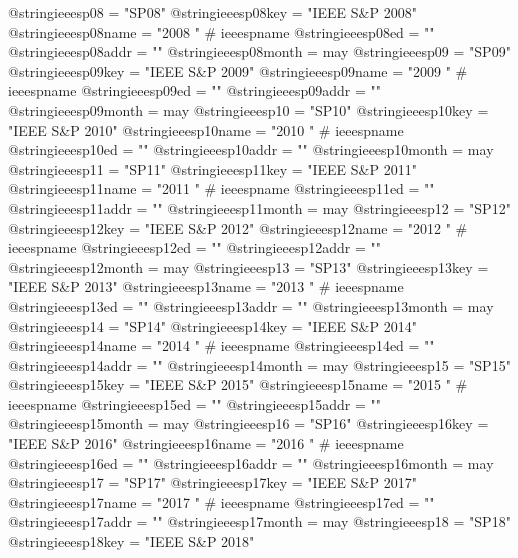 @string{ieeesp08 =              "SP08"}
@string{ieeesp08key =           "IEEE S\&P 2008"}
@string{ieeesp08name =          "2008 " # ieeespname}
@string{ieeesp08ed =            ""}
@string{ieeesp08addr =          ""}
@string{ieeesp08month =         may}
@string{ieeesp09 =              "SP09"}
@string{ieeesp09key =           "IEEE S\&P 2009"}
@string{ieeesp09name =          "2009 " # ieeespname}
@string{ieeesp09ed =            ""}
@string{ieeesp09addr =          ""}
@string{ieeesp09month =         may}
@string{ieeesp10 =              "SP10"}
@string{ieeesp10key =           "IEEE S\&P 2010"}
@string{ieeesp10name =          "2010 " # ieeespname}
@string{ieeesp10ed =            ""}
@string{ieeesp10addr =          ""}
@string{ieeesp10month =         may}
@string{ieeesp11 =              "SP11"}
@string{ieeesp11key =           "IEEE S\&P 2011"}
@string{ieeesp11name =          "2011 " # ieeespname}
@string{ieeesp11ed =            ""}
@string{ieeesp11addr =          ""}
@string{ieeesp11month =         may}
@string{ieeesp12 =              "SP12"}
@string{ieeesp12key =           "IEEE S\&P 2012"}
@string{ieeesp12name =          "2012 " # ieeespname}
@string{ieeesp12ed =            ""}
@string{ieeesp12addr =          ""}
@string{ieeesp12month =         may}
@string{ieeesp13 =              "SP13"}
@string{ieeesp13key =           "IEEE S\&P 2013"}
@string{ieeesp13name =          "2013 " # ieeespname}
@string{ieeesp13ed =            ""}
@string{ieeesp13addr =          ""}
@string{ieeesp13month =         may}
@string{ieeesp14 =              "SP14"}
@string{ieeesp14key =           "IEEE S\&P 2014"}
@string{ieeesp14name =          "2014 " # ieeespname}
@string{ieeesp14ed =            ""}
@string{ieeesp14addr =          ""}
@string{ieeesp14month =         may}
@string{ieeesp15 =              "SP15"}
@string{ieeesp15key =           "IEEE S\&P 2015"}
@string{ieeesp15name =          "2015 " # ieeespname}
@string{ieeesp15ed =            ""}
@string{ieeesp15addr =          ""}
@string{ieeesp15month =         may}
@string{ieeesp16 =              "SP16"}
@string{ieeesp16key =           "IEEE S\&P 2016"}
@string{ieeesp16name =          "2016 " # ieeespname}
@string{ieeesp16ed =            ""}
@string{ieeesp16addr =          ""}
@string{ieeesp16month =         may}
@string{ieeesp17 =              "SP17"}
@string{ieeesp17key =           "IEEE S\&P 2017"}
@string{ieeesp17name =          "2017 " # ieeespname}
@string{ieeesp17ed =            ""}
@string{ieeesp17addr =          ""}
@string{ieeesp17month =         may}
@string{ieeesp18 =              "SP18"}
@string{ieeesp18key =           "IEEE S\&P 2018"}
